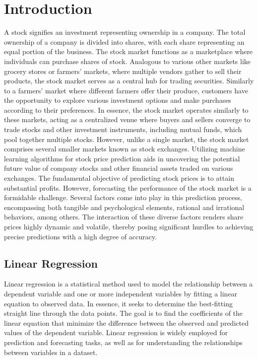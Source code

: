 \documentclass[conference,onecolumn,11pt]{IEEEtran}
\begin{document}
\section{Introduction}
A stock signifies an investment representing ownership in a company. The total ownership of a company is divided into shares, with each share representing an equal portion of the business. The stock market functions as a marketplace where individuals can purchase shares of stock. Analogous to various other markets like grocery stores or farmers’ markets, where multiple vendors gather to sell their products, the stock market serves as a central hub for trading securities. Similarly to a farmers’ market where different farmers offer their produce, customers have the opportunity to explore various investment options and make purchases according to their preferences. In essence, the stock market operates similarly to these markets, acting as a centralized venue where buyers and sellers converge to trade stocks and other investment instruments, including mutual funds, which pool together multiple stocks. However, unlike a single market, the stock market comprises several smaller markets known as stock exchanges.
Utilizing machine learning algorithms for stock price prediction aids in uncovering the potential future value of company stocks and other financial assets traded on various exchanges. The fundamental objective of predicting stock prices is to attain substantial profits. However, forecasting the performance of the stock market is a formidable challenge. Several factors come into play in this prediction process, encompassing both tangible and psychological elements, rational and irrational behaviors, among others.
The interaction of these diverse factors renders share prices highly dynamic and volatile, thereby posing significant hurdles to achieving precise predictions with a high degree of accuracy.


\subsection*{Linear Regression}

Linear regression is a statistical method used to model the relationship between a dependent variable and one or more independent variables by fitting a linear equation to observed data. In essence, it seeks to determine the best-fitting straight line through the data points. The goal is to find the coefficients of the linear equation that minimize the difference between the observed and predicted values of the dependent variable. Linear regression is widely employed for prediction and forecasting tasks, as well as for understanding the relationships between variables in a dataset.
\end{document}
